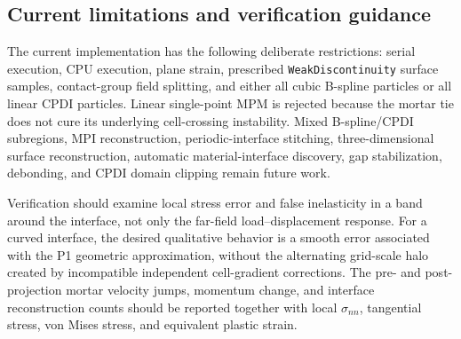 \subsection{Current limitations and verification guidance}

The current implementation has the following deliberate restrictions:
serial execution, CPU execution, plane strain, prescribed
\texttt{WeakDiscontinuity} surface samples, contact-group field splitting, and
either all cubic B-spline particles or all linear CPDI particles.  Linear
single-point MPM is rejected because the mortar tie does not cure its underlying
cell-crossing instability.  Mixed B-spline/CPDI subregions, MPI reconstruction,
periodic-interface stitching, three-dimensional surface reconstruction,
automatic material-interface discovery, gap stabilization, debonding, and CPDI
domain clipping remain future work.

Verification should examine local stress error and false inelasticity in a band
around the interface, not only the far-field load--displacement response.  For a
curved interface, the desired qualitative behavior is a smooth error associated
with the P1 geometric approximation, without the alternating grid-scale halo
created by incompatible independent cell-gradient corrections.  The pre- and
post-projection mortar velocity jumps, momentum change, and interface
reconstruction counts should be reported together with local
$\sigma_{nn}$, tangential stress, von Mises stress, and equivalent plastic
strain.

